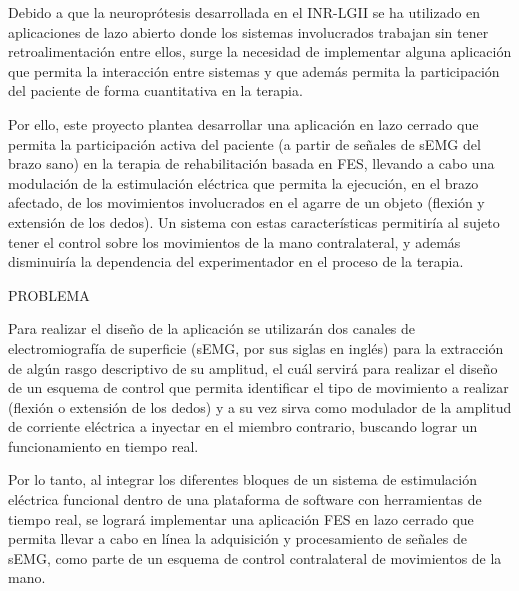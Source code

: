 
Debido a que la neuroprótesis desarrollada en el INR-LGII se ha utilizado en aplicaciones de lazo abierto donde los sistemas involucrados trabajan sin tener retroalimentación entre ellos, surge la necesidad de implementar alguna aplicación que permita la interacción entre sistemas y que además permita la participación del paciente de forma cuantitativa en la terapia.

Por ello, este proyecto plantea desarrollar una aplicación en lazo cerrado que permita la participación activa del paciente (a partir de señales de sEMG del brazo sano) en la terapia de rehabilitación basada en FES, llevando a cabo una modulación de la estimulación eléctrica que permita la ejecución, en el brazo afectado, de los movimientos involucrados en el agarre de un objeto (flexión y extensión de los dedos). Un sistema con estas características permitiría al sujeto tener el control sobre los movimientos de la mano contralateral, y además disminuiría la dependencia del experimentador en el proceso de la terapia.

{\color{red}PROBLEMA\\}

Para realizar el diseño de la aplicación se utilizarán dos canales de electromiografía de superficie (sEMG, por sus siglas en inglés) para la extracción de algún rasgo descriptivo de su amplitud, el cuál servirá para realizar el diseño de un esquema de control que permita identificar el tipo de movimiento a realizar (flexión o extensión de los dedos) y a su vez sirva como modulador de la amplitud de corriente eléctrica a inyectar en el miembro contrario, buscando lograr un funcionamiento en tiempo real.


Por lo tanto, al integrar los diferentes bloques de un sistema de estimulación eléctrica funcional dentro de una plataforma de software con herramientas de tiempo real, se logrará implementar una aplicación FES en lazo cerrado que permita llevar a cabo en línea la adquisición y procesamiento de señales de sEMG, como parte de un esquema de control contralateral de movimientos de la mano.

